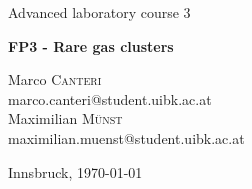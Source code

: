 \documentclass[a4paper,10pt]{article}
\begin{document}
\begin{titlepage}
 \begin{center}
	\Large{Advanced laboratory course 3}
	\end{center}
	\begin{center}
	 \LARGE{\textbf{FP3 - Rare gas clusters}}
	\end{center}

	\begin{center}

	\large Marco \textsc{Canteri} \\
	marco.canteri@student.uibk.ac.at\\
	\large Maximilian \textsc{Münst} \\
	maximilian.muenst@student.uibk.ac.at
	\end{center}

	\begin{center}
	\vspace{1cm}
	Innsbruck, \today
	\vspace{1cm}
	\end{center}

	\begin{abstract}

  \end{abstract}
    \vspace{1cm}


\end{titlepage}
\end{document}
